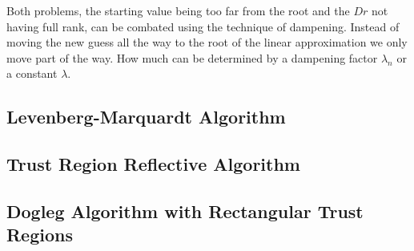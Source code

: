 Both problems, the starting value being too far from the root and the $Dr$ not having full rank, can be combated using the technique of dampening. Instead of moving the new guess all the way to the root of the linear approximation we only move part of the way. How much can be determined by a dampening factor $\lambda_n$ or a constant $\lambda$.

\subsection{Levenberg-Marquardt Algorithm}

\subsection{Trust Region Reflective Algorithm}


\subsection{Dogleg Algorithm with Rectangular Trust Regions}
